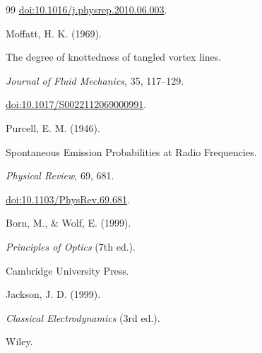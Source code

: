 \documentclass[12pt]{article}
\begin{document}
\begin{thebibliography}{99}
\newblock \href{https://doi.org/10.1016/j.physrep.2010.06.003}{doi:10.1016/j.physrep.2010.06.003}.


Moffatt, H. K. (1969).

\newblock The degree of knottedness of tangled vortex lines.

\newblock \emph{Journal of Fluid Mechanics}, 35, 117–129.

\newblock \href{https://doi.org/10.1017/S0022112069000991}{doi:10.1017/S0022112069000991}.


Purcell, E. M. (1946).

\newblock Spontaneous Emission Probabilities at Radio Frequencies.

\newblock \emph{Physical Review}, 69, 681.

\newblock \href{https://doi.org/10.1103/PhysRev.69.681}{doi:10.1103/PhysRev.69.681}.


Born, M., \& Wolf, E. (1999).

\newblock \emph{Principles of Optics} (7th ed.).

\newblock Cambridge University Press.



Jackson, J. D. (1999).

\newblock \emph{Classical Electrodynamics} (3rd ed.).

\newblock Wiley.


\end{thebibliography}
\end{document}
